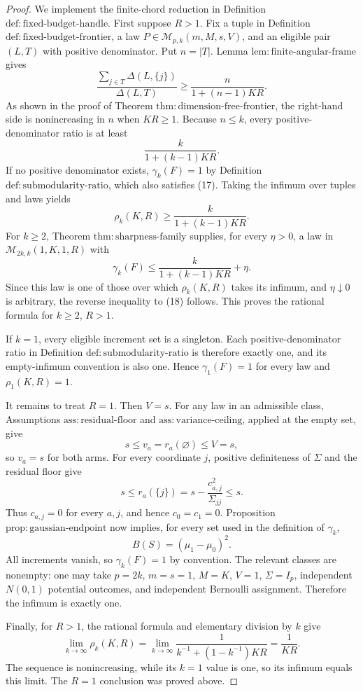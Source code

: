 \documentclass{article}
\begin{document}
\begin{proof}
We implement the finite-chord reduction in Definition \(\mathrm{def{:}fixed\text{-}budget\text{-}handle}\).  First suppose \(R>1\).  Fix a tuple in Definition \(\mathrm{def{:}fixed\text{-}budget\text{-}frontier}\), a law \(P\in\mathcal M_{p,k}(m,M,s,V)\), and an eligible pair \((L,T)\) with positive denominator.  Put \(n=|T|\).  Lemma \(\mathrm{lem{:}finite\text{-}angular\text{-}frame}\) gives
\[
 \frac{\sum_{j\in T}\Delta(L,\{j\})}{\Delta(L,T)}
 \ge\frac{n}{1+(n-1)KR}.
\]
As shown in the proof of Theorem \(\mathrm{thm{:}dimension\text{-}free\text{-}frontier}\), the right-hand side is nonincreasing in \(n\) when \(KR\ge1\).  Because \(n\le k\), every positive-denominator ratio is at least
\[
 \frac{k}{1+(k-1)KR}. \tag{17}
\]
If no positive denominator exists, \(\gamma_k(F)=1\) by Definition \(\mathrm{def{:}submodularity\text{-}ratio}\), which also satisfies (17).  Taking the infimum over tuples and laws yields
\[
 \rho_k(K,R)\ge\frac{k}{1+(k-1)KR}. \tag{18}
\]
For \(k\ge2\), Theorem \(\mathrm{thm{:}sharpness\text{-}family}\) supplies, for every \(\eta>0\), a law in \(\mathcal M_{2k,k}(1,K,1,R)\) with
\[
 \gamma_k(F)\le\frac{k}{1+(k-1)KR}+\eta.
\]
Since this law is one of those over which \(\rho_k(K,R)\) takes its infimum, and \(\eta\downarrow0\) is arbitrary, the reverse inequality to (18) follows.  This proves the rational formula for \(k\ge2\), \(R>1\).

If \(k=1\), every eligible increment set is a singleton.  Each positive-denominator ratio in Definition \(\mathrm{def{:}submodularity\text{-}ratio}\) is therefore exactly one, and its empty-infimum convention is also one.  Hence \(\gamma_1(F)=1\) for every law and \(\rho_1(K,R)=1\).

It remains to treat \(R=1\).  Then \(V=s\).  For any law in an admissible class, Assumptions \(\mathrm{ass{:}residual\text{-}floor}\) and \(\mathrm{ass{:}variance\text{-}ceiling}\), applied at the empty set, give
\[
 s\le v_a=r_a(\varnothing)\le V=s,
\]
so \(v_a=s\) for both arms.  For every coordinate \(j\), positive definiteness of \(\Sigma\) and the residual floor give
\[
 s\le r_a(\{j\})=s-\frac{c_{a,j}^2}{\Sigma_{jj}}\le s.
\]
Thus \(c_{a,j}=0\) for every \(a,j\), and hence \(c_0=c_1=0\).  Proposition \(\mathrm{prop{:}gaussian\text{-}endpoint}\) now implies, for every set used in the definition of \(\gamma_k\),
\[
 B(S)=(\mu_1-\mu_0)^2.
\]
All increments vanish, so \(\gamma_k(F)=1\) by convention.  The relevant classes are nonempty: one may take \(p=2k\), \(m=s=1\), \(M=K\), \(V=1\), \(\Sigma=I_p\), independent \(N(0,1)\) potential outcomes, and independent Bernoulli assignment.  Therefore the infimum is exactly one.

Finally, for \(R>1\), the rational formula and elementary division by \(k\) give
\[
 \lim_{k\to\infty}\rho_k(K,R)
 =\lim_{k\to\infty}\frac{1}{k^{-1}+(1-k^{-1})KR}
 =\frac1{KR}.
\]
The sequence is nonincreasing, while its \(k=1\) value is one, so its infimum equals this limit.  The \(R=1\) conclusion was proved above.
\end{proof}
\end{document}
